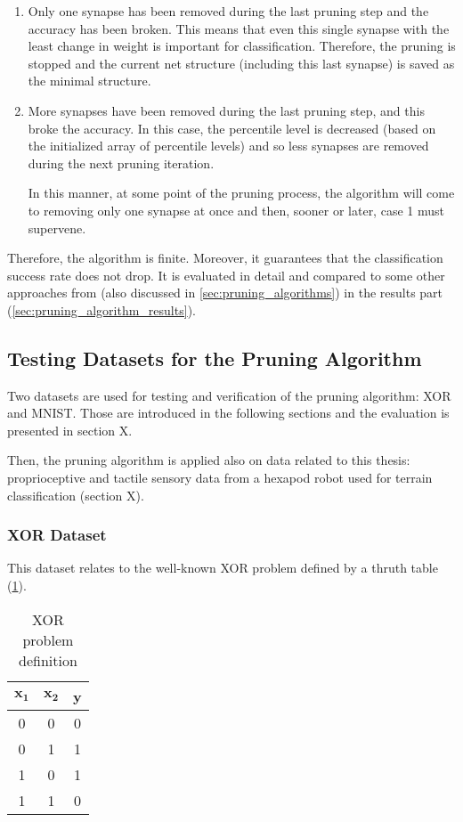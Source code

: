 \begin{enumerate}
\item Only one synapse has been removed during the last pruning step and the accuracy has been broken. This means that even this single synapse with the least change in weight is important for classification. Therefore, the pruning is stopped and the current net structure (including this last synapse) is saved as the minimal structure.
\item More synapses have been removed during the last pruning step, and this broke the accuracy. In this case, the percentile level is decreased (based on the initialized array of percentile levels) and so less synapses are removed during the next pruning iteration.

In this manner, at some point of the pruning process, the algorithm will come to removing only one synapse at once and then, sooner or later, case 1 must supervene.
\end{enumerate}

Therefore, the algorithm is finite. Moreover, it guarantees that the classification success rate does not drop. It is evaluated in detail and compared to some other approaches from \citep{article:10:pa} (also discussed in \cref{sec:pruning_algorithms}) in the results part (\cref{sec:pruning_algorithm_results}).

\subsection{Testing Datasets for the Pruning Algorithm} \label{ssec:testing_datasets}
Two datasets are used for testing and verification of the pruning algorithm: XOR and MNIST. Those are introduced in the following sections and the evaluation is presented in section X.

Then, the pruning algorithm is applied also on data related to this thesis: proprioceptive and tactile sensory data from a hexapod robot used for terrain classification (section X).

\subsubsection*{XOR Dataset}
This dataset relates to the well-known XOR problem defined by a thruth table (\cref{tab:xor}).

\begin{table}[H]
\centering
\caption{XOR problem definition}
\label{tab:xor}
\begin{tabular}{|c|c|c|}
\hline
$ \mathbf{x_1} $ & $ \mathbf{x_2} $ & \textbf{y} \\ \hline
0           & 0           & 0          \\ \hline
0           & 1           & 1          \\ \hline
1           & 0           & 1          \\ \hline
1           & 1           & 0          \\ \hline
\end{tabular}
\end{table}

